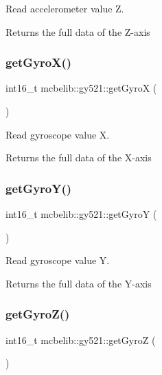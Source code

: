 Read accelerometer value Z. 

Returns the full data of the Z-\/axis \mbox{\label{classmcbelib_1_1gy521_a1145cda6295287a6cda950c156bcf0d9}} 
\subsubsection{\texorpdfstring{get\+Gyro\+X()}{getGyroX()}}
{\footnotesize\ttfamily int16\+\_\+t mcbelib\+::gy521\+::get\+GyroX (\begin{DoxyParamCaption}{ }\end{DoxyParamCaption})}



Read gyroscope value X. 

Returns the full data of the X-\/axis \mbox{\label{classmcbelib_1_1gy521_a8b9cec4004f71c70c3a14b5f6fbf9e4d}} 
\subsubsection{\texorpdfstring{get\+Gyro\+Y()}{getGyroY()}}
{\footnotesize\ttfamily int16\+\_\+t mcbelib\+::gy521\+::get\+GyroY (\begin{DoxyParamCaption}{ }\end{DoxyParamCaption})}



Read gyroscope value Y. 

Returns the full data of the Y-\/axis \mbox{\label{classmcbelib_1_1gy521_a197222a217acdbf8260e9495120497a0}} 
\subsubsection{\texorpdfstring{get\+Gyro\+Z()}{getGyroZ()}}
{\footnotesize\ttfamily int16\+\_\+t mcbelib\+::gy521\+::get\+GyroZ (\begin{DoxyParamCaption}{ }\end{DoxyParamCaption})}



